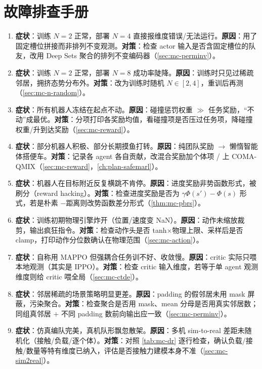 \section*{故障排查手册}
\begin{enumerate}
  \item \textbf{症状}：训练 $N{=}2$ 正常，部署 $N{=}4$ 直接报维度错误/无法运行。\textbf{原因}：用了固定槽位拼接而非排列不变观测。\textbf{对策}：检查 actor 输入是否含固定槽位的队友，改用 Deep Sets 聚合的排列不变编码器（\cref{sec:mc-perminv}）。
  \item \textbf{症状}：训练 $N{=}2$ 正常，部署 $N{=}8$ 成功率陡降。\textbf{原因}：训练时只见过稀疏邻居，拥挤态势分布外。\textbf{对策}：改为训练时随机 $N\in[2,4]$，重训后再测（\cref{sec:mc-n-random}）。
  \item \textbf{症状}：所有机器人冻结在起点不动。\textbf{原因}：碰撞惩罚权重 $\gg$ 任务奖励，“不动”成最优。\textbf{对策}：分项打印各奖励均值，看碰撞项是否压过任务项，降碰撞权重/升到达奖励（\cref{sec:mc-reward}）。
  \item \textbf{症状}：部分机器人积极、部分长期摸鱼打转。\textbf{原因}：纯团队奖励 $\to$ 懒惰智能体搭便车。\textbf{对策}：记录各 agent 各自贡献，改混合奖励加个体项 / 上 COMA-QMIX（\cref{sec:mc-reward}，\cref{ch:plan-safemarl}）。
  \item \textbf{症状}：机器人在目标附近反复横跳不肯停。\textbf{原因}：进度奖励非势函数形式，被刷分（reward hacking）。\textbf{对策}：检查进度奖励是否为 $\gamma\Phi(s')-\Phi(s)$ 形式，若是朴素 $-$距离则改势函数差分形式（\cref{thm:mc-pbrs}）。
  \item \textbf{症状}：训练初期物理引擎炸开（位置/速度变 NaN）。\textbf{原因}：动作未缩放裁剪，输出疯狂指令。\textbf{对策}：检查动作头是否 tanh$\times$物理上限、采样后是否 clamp，打印动作分位数确认在物理范围（\cref{sec:mc-action}）。
  \item \textbf{症状}：自称用 MAPPO 但强耦合任务训不好、收敛慢。\textbf{原因}：critic 实际只喂本地观测（其实是 IPPO）。\textbf{对策}：检查 critic 输入维度，若等于单 agent 观测维度则给 critic 喂全局（\cref{sec:mc-ctde}）。
  \item \textbf{症状}：邻居稀疏的场景策略明显更差。\textbf{原因}：padding 的假邻居未用 mask 屏蔽，污染聚合。\textbf{对策}：检查聚合是否用 mask、mean 分母是否用真实邻居数；同组真邻居 $+$ 不同 padding 数前向输出应一致（\cref{sec:mc-perminv}）。
  \item \textbf{症状}：仿真编队完美，真机队形飘忽散架。\textbf{原因}：多机 sim-to-real 差距未随机化（接触/负载/逐个体）。\textbf{对策}：对照 \cref{tab:mc-dr} 逐行检查，确认负载/接触/数量等特有维度已纳入，评估是否接触力建模本身不准（\cref{sec:mc-sim2real}）。

\end{enumerate}
